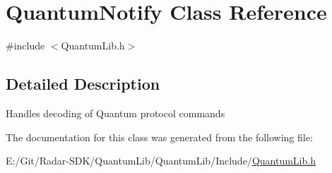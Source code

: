 \hypertarget{class_quantum_notify}{}\section{Quantum\+Notify Class Reference}
\label{class_quantum_notify}


{\ttfamily \#include $<$Quantum\+Lib.\+h$>$}



\subsection{Detailed Description}
Handles decoding of Quantum protocol commands 

The documentation for this class was generated from the following file\+:\begin{DoxyCompactItemize}
\item 
E\+:/\+Git/\+Radar-\/\+S\+D\+K/\+Quantum\+Lib/\+Quantum\+Lib/\+Include/\mbox{\hyperlink{_quantum_lib_8h}{Quantum\+Lib.\+h}}\end{DoxyCompactItemize}
